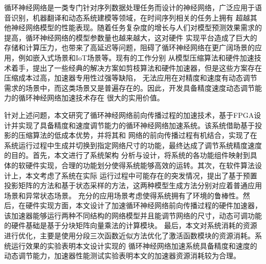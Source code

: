 	
\begin{chineseabstract}
循环神经网络是一类专门针对序列数据处理任务而设计的神经网络，广泛应用于语音识别，机器翻译和动态系统建模等领域，在时间序列相关的任务上拥有
超越其他神经网络模型的性能表现。随着任务复杂度的增长与人们对模型预测效果需求的提高，循环神经网络的模型参数量也越来越大，这对硬件
实现平台造成了巨大的存储和计算压力，也带来了高延迟等问题，阻碍了循环神经网络在更广阔场景的应用，例如嵌入式场景和IoT场景等。现有的工作分别
从模型压缩算法和硬件加速技术着手，提出了一些经典的解决方案如剪枝算法和硬件加速器，但是这些方案存在压缩成本过高，加速器专用性过强等缺陷，
无法应用在对精度和速度有动态调节需求的场景中，而这类场景又是普遍存在的。因此，开发具备精度速度动态调节能力的循环神经网络加速技术存在
很大的实用价值。

针对上述问题，本文研究了循环神经网络前向传播过程的加速技术，基于FPGA设计并实现了具备精度和速度调节能力的循环神经网络加速系统。该系统借助基于投影的压缩算法的低成本优势，并将其和
网络的前向传播过程有机结合，实现了在系统运行过程中生成并切换到指定网络尺寸的功能，最终达成了调节系统精度速度的目的。首先，本文进行了系统架构
分析与设计，将系统的各功能组件映射到具体的软硬件实现，合理的功能划分使得系统能够高效的运转。其次，在软件算法设计上，本文考虑了系统在实际
运行过程中可能存在的突发情况，提出了基于预置投影矩阵的方法和基于状态采样的方法，这两种模型生成方法分别对应着普通应用场景和异常状态场景。
充分的应用场景考虑使得系统拥有了环境的鲁棒性。然后，在硬件实现方面，本文设计了加速循环神经网络前向传播过程的硬件加速器，
该加速器能够运行两种不同结构的网络模型并且能调节网络的尺寸，动态可调功能的硬件基础是基于分块矩阵向量乘法的计算模块。
最后，本文对系统消耗的资源进行优化，主要是使用分段三次函数近似方法优化了激活函数模块的资源消耗。系统运行效果的实验表明本文设计实现的
循环神经网络加速系统具备精度和速度的动态调节能力，加速器性能测试实验表明本文的加速器资源消耗较为合理。



\end{chineseabstract}
